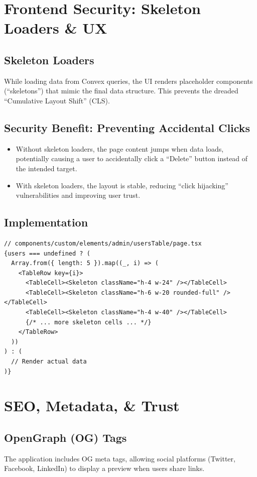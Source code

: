 \documentclass[11pt,a4paper]{article}
\begin{document}
\section{Frontend Security: Skeleton Loaders \& UX}

\subsection{Skeleton Loaders}
While loading data from Convex queries, the UI renders placeholder components (``skeletons'') that mimic the final data structure. This prevents the dreaded ``Cumulative Layout Shift'' (CLS).

\subsection{Security Benefit: Preventing Accidental Clicks}
\begin{itemize}
    \item Without skeleton loaders, the page content jumps when data loads, potentially causing a user to accidentally click a ``Delete'' button instead of the intended target.
    \item With skeleton loaders, the layout is stable, reducing ``click hijacking'' vulnerabilities and improving user trust.
\end{itemize}

\subsection{Implementation}
\begin{lstlisting}
// components/custom/elements/admin/usersTable/page.tsx
{users === undefined ? (
  Array.from({ length: 5 }).map((_, i) => (
    <TableRow key={i}>
      <TableCell><Skeleton className="h-4 w-24" /></TableCell>
      <TableCell><Skeleton className="h-6 w-20 rounded-full" /></TableCell>
      <TableCell><Skeleton className="h-4 w-40" /></TableCell>
      {/* ... more skeleton cells ... */}
    </TableRow>
  ))
) : (
  // Render actual data
)}
\end{lstlisting}

\section{SEO, Metadata, \& Trust}

\subsection{OpenGraph (OG) Tags}
The application includes OG meta tags, allowing social platforms (Twitter, Facebook, LinkedIn) to display a preview when users share links.
\end{document}
